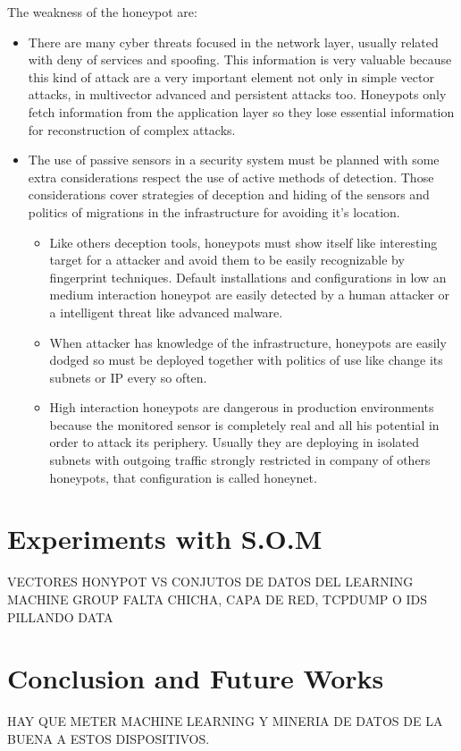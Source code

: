 \documentclass[a4paper]{llncs}
\begin{document}
The weakness of the honeypot are:
\begin{itemize}
	\item There are many cyber threats focused in the network layer, usually related with deny of services and spoofing. This information is very valuable because this kind of attack are a very important element not only in simple vector attacks, in multivector advanced and persistent attacks too. Honeypots only fetch information from the application layer so they lose essential information for reconstruction of complex attacks.
	\item The use of passive sensors in a security system must be planned with some extra considerations respect the use of active methods of detection. Those considerations cover strategies of deception and hiding of the sensors and politics of migrations in the infrastructure for avoiding it's location.
	\begin{itemize}
		\item Like others deception tools, honeypots must show itself like interesting target for a attacker and avoid them to be easily recognizable by fingerprint techniques. Default installations and configurations in low an medium interaction honeypot are easily detected by a human attacker or a intelligent threat like advanced malware.
		\item When attacker has knowledge of the infrastructure, honeypots are easily dodged so must be deployed together with politics of use like change its subnets or IP every so often.
		\item High interaction honeypots are dangerous in production environments because the monitored sensor is completely real and all his potential in order to attack its periphery. Usually they are deploying in isolated subnets with outgoing traffic strongly restricted in company of others honeypots, that configuration is called honeynet.
	\end{itemize}
\end{itemize}
	
\section{Experiments with S.O.M}
\label{sec:Improve}
VECTORES HONYPOT VS CONJUTOS DE DATOS DEL LEARNING MACHINE GROUP
FALTA CHICHA, CAPA DE RED, TCPDUMP O IDS PILLANDO DATA

\section{Conclusion and Future Works}
\label{sec:conclusion&future}
HAY QUE METER MACHINE LEARNING Y MINERIA DE DATOS DE LA BUENA A ESTOS DISPOSITIVOS.



\end{document}
